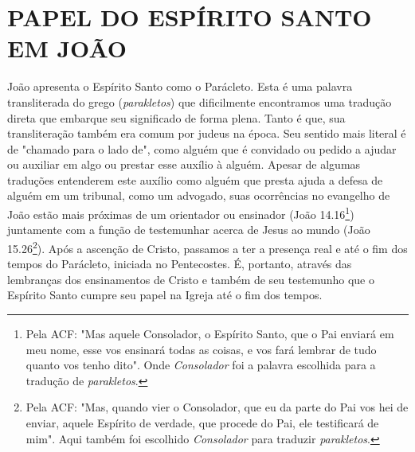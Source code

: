\documentclass[
    article,            %
	12pt,				%
	oneside,			%
	a4paper,			%
	chapter=TITLE,		%
	section=TITLE,		%
	english,			%
	french,				%
	spanish,			%
	brazil				%
	]{abntex2}
\begin{document}
\section*{PAPEL DO ESPÍRITO SANTO EM JOÃO}
João apresenta o Espírito Santo como o Parácleto. Esta é uma palavra transliterada do grego (\emph{parakletos}) que dificilmente encontramos uma tradução direta que embarque seu significado de forma plena. Tanto é que, sua transliteração também era comum por judeus na época. Seu sentido mais literal é de "chamado para o lado de", como alguém que é convidado ou pedido a ajudar ou auxiliar em algo ou prestar esse auxílio à alguém. Apesar de algumas traduções entenderem este auxílio como alguém que presta ajuda a defesa de alguém em um tribunal, como um advogado, suas ocorrências no evangelho de João estão mais próximas de um orientador ou ensinador (João 14.16\footnote{Pela ACF: "Mas aquele Consolador, o Espírito Santo, que o Pai enviará em meu nome, esse vos ensinará todas as coisas, e vos fará lembrar de tudo quanto vos tenho dito". Onde \emph{Consolador} foi a palavra escolhida para a tradução de \emph{parakletos}.}) juntamente com a função de testemunhar acerca de Jesus ao mundo (João 15.26\footnote{Pela ACF: "Mas, quando vier o Consolador, que eu da parte do Pai vos hei de enviar, aquele Espírito de verdade, que procede do Pai, ele testificará de mim". Aqui também foi escolhido \emph{Consolador} para traduzir \emph{parakletos}.}). Após a ascenção de Cristo, passamos a ter a presença real e até o fim dos tempos do Parácleto, iniciada no Pentecostes. É, portanto, através das lembranças dos ensinamentos de Cristo e também de seu testemunho que o Espírito Santo cumpre seu papel na Igreja até o fim dos tempos.





% 
\end{document}
